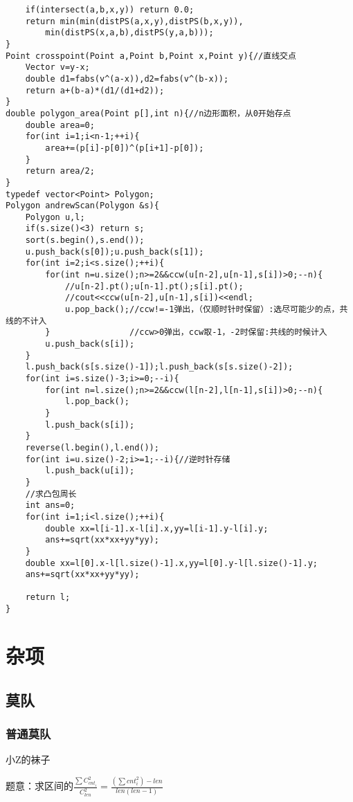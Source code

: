 \documentclass[UTF8]{ctexart}
\begin{document}
\begin{lstlisting}
    if(intersect(a,b,x,y)) return 0.0;
    return min(min(distPS(a,x,y),distPS(b,x,y)),
        min(distPS(x,a,b),distPS(y,a,b)));
}
Point crosspoint(Point a,Point b,Point x,Point y){//直线交点 
    Vector v=y-x;
    double d1=fabs(v^(a-x)),d2=fabs(v^(b-x));
    return a+(b-a)*(d1/(d1+d2));
}
double polygon_area(Point p[],int n){//n边形面积，从0开始存点 
    double area=0;
    for(int i=1;i<n-1;++i){
        area+=(p[i]-p[0])^(p[i+1]-p[0]);
    }
    return area/2;
}
typedef vector<Point> Polygon;
Polygon andrewScan(Polygon &s){
    Polygon u,l;
    if(s.size()<3) return s;
    sort(s.begin(),s.end());
    u.push_back(s[0]);u.push_back(s[1]);
    for(int i=2;i<s.size();++i){
        for(int n=u.size();n>=2&&ccw(u[n-2],u[n-1],s[i])>0;--n){
            //u[n-2].pt();u[n-1].pt();s[i].pt();
            //cout<<ccw(u[n-2],u[n-1],s[i])<<endl;
            u.pop_back();//ccw!=-1弹出，（仅顺时针时保留）:选尽可能少的点，共线的不计入 
        }                //ccw>0弹出，ccw取-1，-2时保留:共线的时候计入 
        u.push_back(s[i]);
    }
    l.push_back(s[s.size()-1]);l.push_back(s[s.size()-2]);
    for(int i=s.size()-3;i>=0;--i){
        for(int n=l.size();n>=2&&ccw(l[n-2],l[n-1],s[i])>0;--n){
            l.pop_back();
        }
        l.push_back(s[i]);
    }
    reverse(l.begin(),l.end());
    for(int i=u.size()-2;i>=1;--i){//逆时针存储 
        l.push_back(u[i]);
    }
    //求凸包周长 
    int ans=0;
    for(int i=1;i<l.size();++i){
        double xx=l[i-1].x-l[i].x,yy=l[i-1].y-l[i].y;
        ans+=sqrt(xx*xx+yy*yy);
    }
    double xx=l[0].x-l[l.size()-1].x,yy=l[0].y-l[l.size()-1].y;
    ans+=sqrt(xx*xx+yy*yy);
    
    return l; 
} 
\end{lstlisting}
\section{杂项}
\subsection{莫队}
\subsubsection{普通莫队}
小Z的袜子

题意：求区间的$\frac{\sum C_{cnt_i}^{2}}{C_{len}^{2}}=\frac{(\sum cnt_i^2) -len}{len(len-1)}$
\end{document}
